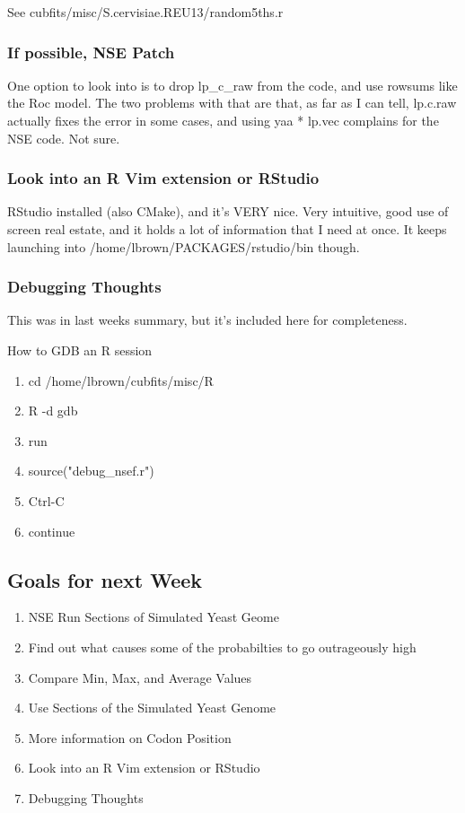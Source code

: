 See cubfits/misc/S.cervisiae.REU13/random5ths.r


\subsubsection{If possible, NSE Patch}

One option to look into is to drop lp\_c\_raw from the code, and use rowsums like the Roc model. The two problems with that are that, as far as I can tell, lp.c.raw actually fixes the error in some cases, and using yaa * lp.vec complains for the NSE code. Not sure.

\subsubsection{Look into an R Vim extension or RStudio}

RStudio installed (also CMake), and it's VERY nice. Very intuitive, good use of screen real estate, and it holds a lot of information that I need at once. It keeps launching into /home/lbrown/PACKAGES/rstudio/bin though.

\subsubsection{Debugging Thoughts}

This was in last weeks summary, but it's included here for completeness.

How to GDB an R session
\begin{enumerate}
\item cd /home/lbrown/cubfits/misc/R
\item R -d gdb
\item run
\item source("debug\_nsef.r")
\item Ctrl-C
\item continue
\end{enumerate}





\subsection{Goals for next Week}
\begin{enumerate}
\item NSE Run Sections of Simulated Yeast Geome
\item Find out what causes some of the probabilties to go outrageously high
\item Compare Min, Max, and Average Values
\item Use Sections of the Simulated Yeast Genome
\item More information on Codon Position
\item Look into an R Vim extension or RStudio
\item Debugging Thoughts
\end{enumerate}


